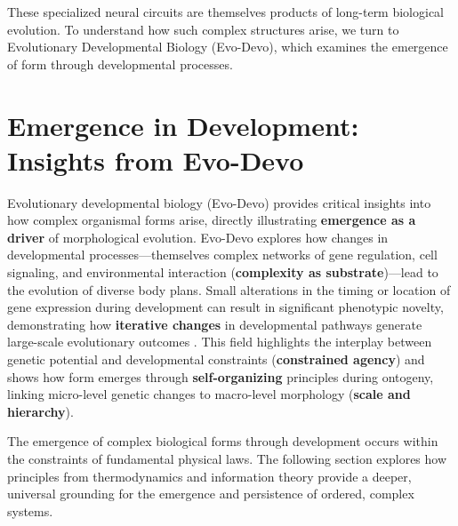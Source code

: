 These specialized neural circuits are themselves products of long-term biological evolution. To understand how such complex structures arise, we turn to Evolutionary Developmental Biology (Evo-Devo), which examines the emergence of form through developmental processes.

\section{Emergence in Development: Insights from Evo-Devo} \label{sec:evodevo}
Evolutionary developmental biology (Evo-Devo) provides critical insights into how complex organismal forms arise, directly illustrating \textbf{emergence as a driver} of morphological evolution. Evo-Devo explores how changes in developmental processes---themselves complex networks of gene regulation, cell signaling, and environmental interaction (\textbf{complexity as substrate})---lead to the evolution of diverse body plans. Small alterations in the timing or location of gene expression during development can result in significant phenotypic novelty, demonstrating how \textbf{iterative changes} in developmental pathways generate large-scale evolutionary outcomes \citep{hall2003evo,davidson2006gene}. This field highlights the interplay between genetic potential and developmental constraints (\textbf{constrained agency}) and shows how form emerges through \textbf{self-organizing} principles during ontogeny, linking micro-level genetic changes to macro-level morphology (\textbf{scale and hierarchy}).

The emergence of complex biological forms through development occurs within the constraints of fundamental physical laws. The following section explores how principles from thermodynamics and information theory provide a deeper, universal grounding for the emergence and persistence of ordered, complex systems.

